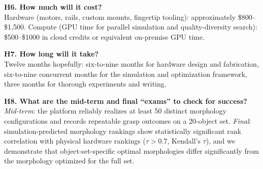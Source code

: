 \documentclass[journal]{IEEEtran}
\begin{document}
\begin{heilbox}
\smallskip
\textbf{H6. How much will it cost?}\\
Hardware (motors, rails, custom mounts, fingertip tooling): approximately \$800--\$1{,}500.
Compute (GPU time for parallel simulation and quality-diversity search): \$500--\$1000
in cloud credits or equivalent on-premise GPU time.

\smallskip
\textbf{H7. How long will it take?}\\
Twelve months hopefully: six-to-nine months for hardware design and fabrication,
six-to-nine concurrent months for the simulation and optimization framework, three months for thorough experiments and writing.

\smallskip
\textbf{H8. What are the mid-term and final ``exams'' to check for success?}\\
\emph{Mid-term}: the platform reliably realizes at least 50 distinct morphology configurations
and records repeatable grasp outcomes on a 20-object set.
\emph{Final}: simulation-predicted morphology rankings show statistically significant rank
correlation with physical hardware rankings ($\tau > 0.7$, Kendall's $\tau$), and we
demonstrate that object-set-specific optimal morphologies differ significantly from the
morphology optimized for the full set.
\end{heilbox}
\end{document}
